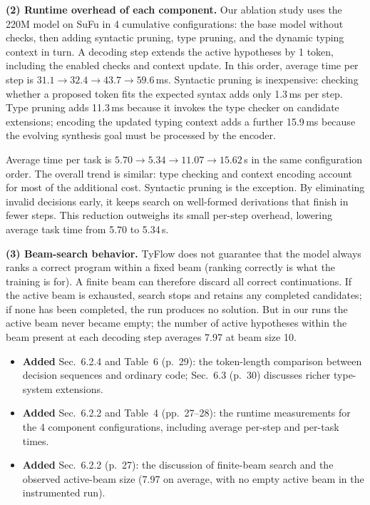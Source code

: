 \documentclass[11pt,a4paper]{article}
\newcommand{\changesmade}[1]{\par\medskip\needspace{4\baselineskip}\noindent{\bfseries\color{accent}Changes made.}%
  \par\nopagebreak\smallskip#1\par}
\begin{document}
\textbf{(2) Runtime overhead of each component.} Our ablation study uses the 220M model on SuFu in 4 cumulative configurations: the base model without checks, then adding syntactic pruning, type pruning, and the dynamic typing context in turn. A decoding step extends the active hypotheses by 1 token, including the enabled checks and context update. In this order, average time per step is $31.1 \to 32.4 \to 43.7 \to 59.6$\,ms. Syntactic pruning is inexpensive: checking whether a proposed token fits the expected syntax adds only 1.3\,ms per step. Type pruning adds 11.3\,ms because it invokes the type checker on candidate extensions; encoding the updated typing context adds a further 15.9\,ms because the evolving synthesis goal must be processed by the encoder. 

Average time per task is $5.70 \to 5.34 \to 11.07 \to 15.62$\,s in the same configuration order. The overall trend is similar: type checking and context encoding account for most of the additional cost. Syntactic pruning is the exception. By eliminating invalid decisions early, it keeps search on well-formed derivations that finish in fewer steps. This reduction outweighs its small per-step overhead, lowering average task time from 5.70 to 5.34\,s.

\textbf{(3) Beam-search behavior.} TyFlow does not guarantee that the model always ranks a correct program within a fixed beam (ranking correctly is what the training is for). A finite beam can therefore discard all correct continuations. If the active beam is exhausted, search stops and retains any completed candidates; if none has been completed, the run produces no solution. But in our runs the active beam never became empty; the number of active hypotheses within the beam present at each decoding step averages 7.97 at beam size 10.

\changesmade{\begin{itemize}[leftmargin=1.2em,itemsep=1pt,topsep=2pt]
  \item \textbf{Added} Sec.~6.2.4 and Table~6 (p.~29): the token-length comparison between decision sequences and ordinary code; Sec.~6.3 (p.~30) discusses richer type-system extensions.
  \item \textbf{Added} Sec.~6.2.2 and Table~4 (pp.~27--28): the runtime measurements for the 4 component configurations, including average per-step and per-task times.
  \item \textbf{Added} Sec.~6.2.2 (p.~27): the discussion of finite-beam search and the observed active-beam size (7.97 on average, with no empty active beam in the instrumented run).
\end{itemize}}
\end{document}
